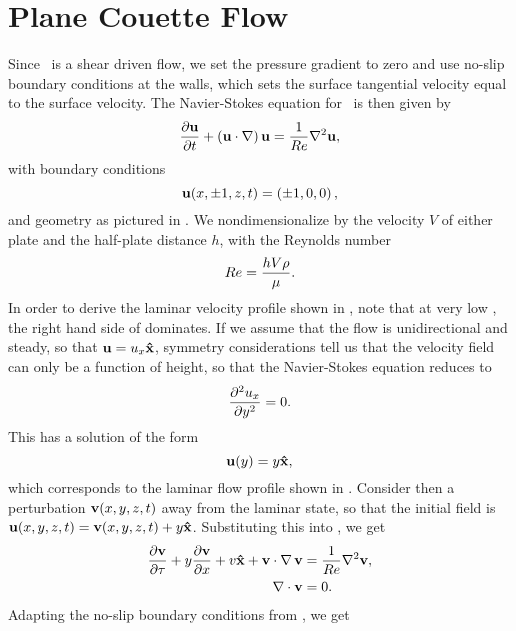 \section{Plane Couette Flow}
Since \pCf\ is a shear driven flow, we set the pressure gradient to zero and use no-slip boundary conditions at the walls, which sets the surface tangential velocity equal to the surface velocity. The Navier-Stokes equation for \pCf\ is then given by 
\begin{equation}\label{eq:NSPCF}
\pder{1}{\Vector{u}}{t} + \paren{\Vector{u}\cdot\nabla}\Vector{u} = \frac{1}{\ReN}\nabla^2\Vector{u},
\end{equation}
with boundary conditions 
\begin{equation}\label{eq:PCBC}
\mathbf{u}(x,\pm1,z,t) = \left ( \pm1,0,0 \right ),
\end{equation}
and geometry as pictured in . We nondimensionalize by the velocity $V$ of either plate and the half-plate distance $h$, with the Reynolds number
\begin{equation}
Re = \dfrac{hV\rho}{\mu}.
\end{equation} In order to derive the laminar velocity profile shown in , note that at very low \ReN, the right hand side of  dominates. If we assume that the flow is unidirectional and steady, so that $\mathbf{u} = u_x \mathbf{\hat{x}}$, symmetry considerations tell us that the velocity field can only be a function of height, so that the Navier-Stokes equation reduces to 
\begin{equation}
\pder{2}{u_x}{y} = 0.
\end{equation}
This has a solution of the form
\begin{equation}
\mathbf{u}(y) = y\mathbf{\hat{x}},
\end{equation}
which corresponds to the laminar flow profile shown in . Consider then a perturbation $\mathbf{v}(x,y,z,t)$ away from the laminar state, so that the initial field is $\mathbf{u}(x,y,z,t) = \mathbf{v} (x,y,z,t)+ y\mathbf{\hat{x}}$. Substituting this into , we get 
\begin{align}
\pder{1}{\Vector{v}}{\tau} + y\pder{1}{\Vector{v}}{x} + v\Vector{\hat{x}} + \Vector{v}\cdot\Grad{\Vector{v}} &= \frac{1}{\ReN} \nabla^2\Vector{v},\label{eq:PertND}\\
\Div{\Vector{v}} &= 0.
\end{align}
Adapting the no-slip boundary conditions from , we get

